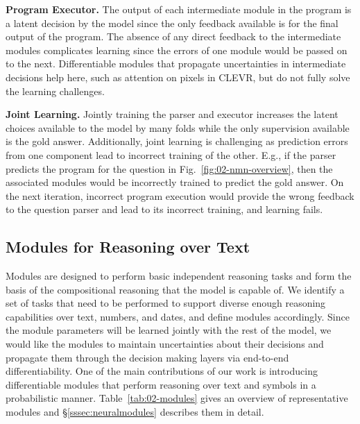 \documentclass[main.tex]{subfiles}
\begin{document}
\textbf{Program Executor.}
The output of each intermediate module in the program is a latent decision by the model since the only feedback available is for the final output of the program.  The absence of any direct feedback to the intermediate modules complicates learning since the errors of one module would be passed on to the next.  Differentiable modules that propagate uncertainties in intermediate decisions help here, such as attention on pixels in CLEVR, but do not fully solve the learning challenges.


\textbf{Joint Learning.}
Jointly training the parser and executor increases the latent choices available to the model by many folds while the only supervision available is the gold answer.
Additionally, joint learning is challenging as prediction errors from one component lead to incorrect training of the other.
E.g., if the parser predicts the program  for the question in Fig.~\ref{fig:02-nmn-overview}, then the associated modules would be incorrectly trained to predict the gold answer. On the next iteration, incorrect program execution would provide the wrong feedback to the question parser and lead to its incorrect training, and learning fails.


\subsection{Modules for Reasoning over Text}
\label{ssec:modules}
Modules are designed to perform basic independent reasoning tasks and form the basis of the compositional reasoning that the model is capable of.
We identify a set of tasks that need to be performed to support diverse enough reasoning capabilities over text, numbers, and dates, and define modules accordingly.
Since the module parameters will be learned jointly with the rest of the model, we would like the modules to maintain uncertainties about their decisions and propagate them through the decision making layers via end-to-end differentiability.
One of the main contributions of our work is introducing differentiable modules that perform reasoning over text and symbols in a probabilistic manner.
Table~\ref{tab:02-modules} gives an overview of representative modules and \S\ref{sssec:neuralmodules} describes them in detail.
\end{document}
